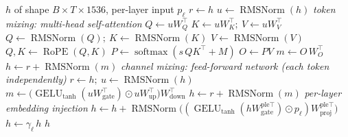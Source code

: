 \documentclass[10pt,a4paper]{article}
\newcommand{\op}[1]{\operatorname{#1}}
\theoremstyle{definition}
\begin{document}
\begin{algorithm}[H]
\caption{Block $\mathcal{B}_{\mathrm{F1}}(h)$ --- Full (global) attention block (MLP width 6144)}
\begin{algorithmic}[1]
\Require $h$ of shape $B\times T\times 1536$, per-layer input $p_\ell$
\State $r \gets h$ 
\State $u \gets \op{RMSNorm}(h)$ 
\Statex \hspace{-1.2em}\textit{token mixing: multi-head self-attention}
\State $Q \gets u W_Q^{\top}$ 
\State $K \gets u W_K^{\top};\ V \gets u W_V^{\top}$ 
\State $Q \gets \op{RMSNorm}(Q);\ K \gets \op{RMSNorm}(K)$ 
\State $V \gets \op{RMSNorm}(V)$
\State $Q, K \gets \op{RoPE}(Q, K)$ 
\State $P \gets \op{softmax}(s\, Q K^{\top} + M)$ 
\State $O \gets P V$ 
\State $m \gets O\, W_O^{\top}$ 
\State $h \gets r + \op{RMSNorm}(m)$ 
\Statex \hspace{-1.2em}\textit{channel mixing: feed-forward network (each token independently)}
\State $r \gets h;\ u \gets \op{RMSNorm}(h)$
\State $m \gets \big(\op{GELU}_{\tanh}(u W_{\mathrm{gate}}^{\top}) \odot u W_{\mathrm{up}}^{\top}\big) W_{\mathrm{down}}^{\top}$ 
\State $h \gets r + \op{RMSNorm}(m)$ 
\Statex \hspace{-1.2em}\textit{per-layer embedding injection}
\State $h \gets h + \op{RMSNorm}\big((\op{GELU}_{\tanh}(h W^{\mathrm{ple}\top}_{\mathrm{gate}}) \odot p_\ell) W^{\mathrm{ple}\top}_{\mathrm{proj}}\big)$ 
\State $h \gets \gamma_\ell\, h$ 
\State \Return $h$
\end{algorithmic}
\end{algorithm}
\end{document}

